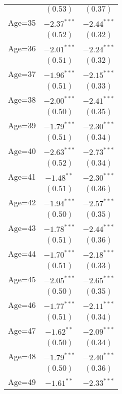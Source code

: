 \documentclass[fullpage]{paper}
\begin{document}
\begin{center}
\begin{longtable}{l c c }
            & $(0.53)$      & $(0.37)$      \\
Age=35      & $-2.37^{***}$ & $-2.44^{***}$ \\
            & $(0.52)$      & $(0.32)$      \\
Age=36      & $-2.01^{***}$ & $-2.24^{***}$ \\
            & $(0.51)$      & $(0.32)$      \\
Age=37      & $-1.96^{***}$ & $-2.15^{***}$ \\
            & $(0.51)$      & $(0.33)$      \\
Age=38      & $-2.00^{***}$ & $-2.41^{***}$ \\
            & $(0.50)$      & $(0.35)$      \\
Age=39      & $-1.79^{***}$ & $-2.30^{***}$ \\
            & $(0.51)$      & $(0.34)$      \\
Age=40      & $-2.63^{***}$ & $-2.73^{***}$ \\
            & $(0.52)$      & $(0.34)$      \\
Age=41      & $-1.48^{**}$  & $-2.30^{***}$ \\
            & $(0.51)$      & $(0.36)$      \\
Age=42      & $-1.94^{***}$ & $-2.57^{***}$ \\
            & $(0.50)$      & $(0.35)$      \\
Age=43      & $-1.78^{***}$ & $-2.44^{***}$ \\
            & $(0.51)$      & $(0.36)$      \\
Age=44      & $-1.70^{***}$ & $-2.18^{***}$ \\
            & $(0.51)$      & $(0.33)$      \\
Age=45      & $-2.05^{***}$ & $-2.65^{***}$ \\
            & $(0.50)$      & $(0.35)$      \\
Age=46      & $-1.77^{***}$ & $-2.11^{***}$ \\
            & $(0.51)$      & $(0.34)$      \\
Age=47      & $-1.62^{**}$  & $-2.09^{***}$ \\
            & $(0.50)$      & $(0.34)$      \\
Age=48      & $-1.79^{***}$ & $-2.40^{***}$ \\
            & $(0.50)$      & $(0.36)$      \\
Age=49      & $-1.61^{**}$  & $-2.33^{***}$ \\

\end{longtable}
\end{center}
\end{document}
